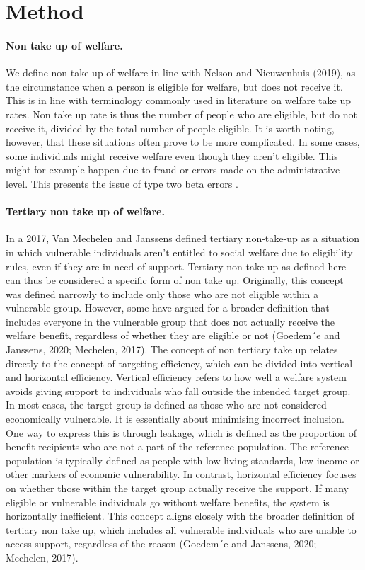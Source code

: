 \section{Method} 

\paragraph{Non take up of welfare.}

We define non take up of welfare in line with Nelson and Nieuwenhuis (2019), as the circumstance when a person is eligible for welfare, but does not receive it. This is in line with terminology commonly used in literature on welfare take up rates. Non take up rate is thus the number of people who are eligible, but do not receive it, divided by the total number of people eligible. It is worth noting, however, that these situations often prove to be more complicated. In some cases, some individuals might receive welfare even though they aren’t eligible. This might for example happen due to fraud or errors made on the administrative level. This presents the issue of type two beta errors \citep{herber_non-take-up_2019, nelson_towards_2021}.

\paragraph{Tertiary non take up of welfare.}
In a 2017, Van Mechelen and Janssens defined tertiary non-take-up
as a situation in which vulnerable individuals aren’t entitled to social welfare due to eligibility rules, even
if they are in need of support. Tertiary non-take up as defined here can thus be considered a specific
form of non take up. Originally, this concept was defined narrowly to include only those who are not
eligible within a vulnerable group. However, some have argued for a broader definition that includes
everyone in the vulnerable group that does not actually receive the welfare benefit, regardless of whether
they are eligible or not (Goedem´e and Janssens, 2020; Mechelen, 2017).
The concept of non tertiary take up relates directly to the concept of targeting efficiency, which can be
divided into vertical- and horizontal efficiency. Vertical efficiency refers to how well a welfare system avoids
giving support to individuals who fall outside the intended target group. In most cases, the target group
is defined as those who are not considered economically vulnerable. It is essentially about minimising
incorrect inclusion. One way to express this is through leakage, which is defined as the proportion of
benefit recipients who are not a part of the reference population. The reference population is typically
defined as people with low living standards, low income or other markers of economic vulnerability.
In contrast, horizontal efficiency focuses on whether those within the target group actually receive the
support. If many eligible or vulnerable individuals go without welfare benefits, the system is horizontally
inefficient. This concept aligns closely with the broader definition of tertiary non take up, which includes
all vulnerable individuals who are unable to access support, regardless of the reason (Goedem´e and
Janssens, 2020; Mechelen, 2017).


